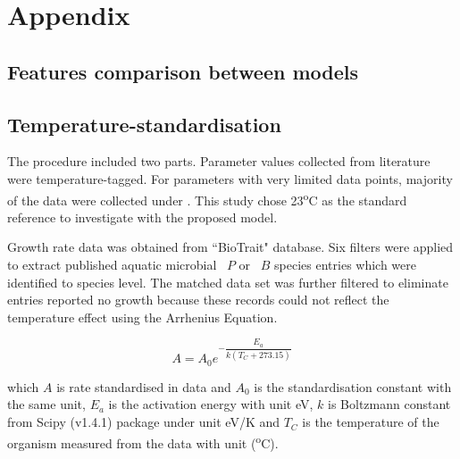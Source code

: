 \documentclass[../thesis.tex]{subfiles} %
\begin{document}
\section{Appendix}
\beginSupp

\subsection{Features comparison between models}


\subsection{Temperature-standardisation}
The procedure included two parts.  Parameter values collected from literature were temperature-tagged.  For parameters with very limited data points, majority of the data were collected under \temp.  This study chose 23\textsuperscript{o}C as the standard reference to investigate with the proposed model.

Growth rate data was obtained from ``BioTrait" database\autocite{della2013thermal}.  Six filters were applied to extract published aquatic microbial \phy\ $P$ or \bac\ $B$ species entries which were identified to species level.  The matched data set was further filtered to eliminate entries reported no growth because these records could not reflect the temperature effect using the Arrhenius Equation.

\begin{equation}
    A = A_0e^{-\dfrac{E_a}{k(T_C+273.15)}}
    \label{arrEq}
\end{equation}

which $A$ is rate standardised in data and $A_0$ is the standardisation constant with the same unit, $E_a$ is the activation energy with unit eV, $k$ is Boltzmann constant from Scipy (v1.4.1) package under unit eV/K and $T_C$ is the temperature of the organism measured from the data with unit (\textsuperscript{o}C).
\end{document}
